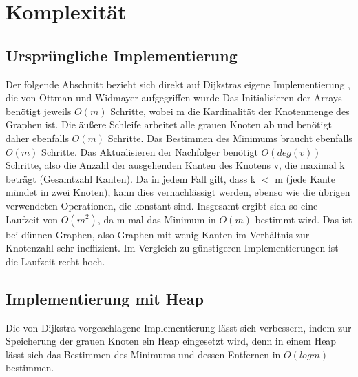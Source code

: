\section{Komplexität}

\subsection{Ursprüngliche Implementierung}

Der folgende Abschnitt bezieht sich direkt auf Dijkstras eigene Implementierung 
\cite[S.110-111]{Dijk88}
, die von Ottman und Widmayer aufgegriffen wurde 
\cite[S.573-574, Algorithmus]{OttWid90}
Das Initialisieren der Arrays benötigt jeweils $O(m)$ Schritte, wobei m die Kardinalität der Knotenmenge des Graphen ist.
Die äußere Schleife arbeitet alle grauen Knoten ab und benötigt daher ebenfalls $O(m)$ Schritte. Das Bestimmen des Minimums braucht ebenfalls $O(m)$ Schritte.
Das Aktualisieren der Nachfolger benötigt $O(deg(v))$ Schritte, also die Anzahl der ausgehenden Kanten des Knotens v, die maximal k beträgt (Gesamtzahl Kanten). Da in jedem Fall gilt, dass k $<$ m (jede Kante mündet in zwei Knoten), kann dies vernachlässigt werden, ebenso wie die übrigen verwendeten Operationen, die konstant sind.
Insgesamt ergibt sich so eine Laufzeit von $O(m^{2})$,
\cite[S.576 Z.13, Algorithmus]{OttWid90}
 da m mal das Minimum in $O(m)$ bestimmt wird.
Das ist bei dünnen Graphen, also Graphen mit wenig Kanten im Verhältnis zur Knotenzahl sehr ineffizient. Im Vergleich zu günstigeren Implementierungen ist die Laufzeit recht hoch.

\subsection{Implementierung mit Heap}
Die von Dijkstra vorgeschlagene Implementierung lässt sich verbessern, indem zur Speicherung der grauen Knoten ein Heap eingesetzt wird, denn in einem Heap lässt sich das Bestimmen des Minimums und dessen Entfernen in $O(log m)$ bestimmen.

